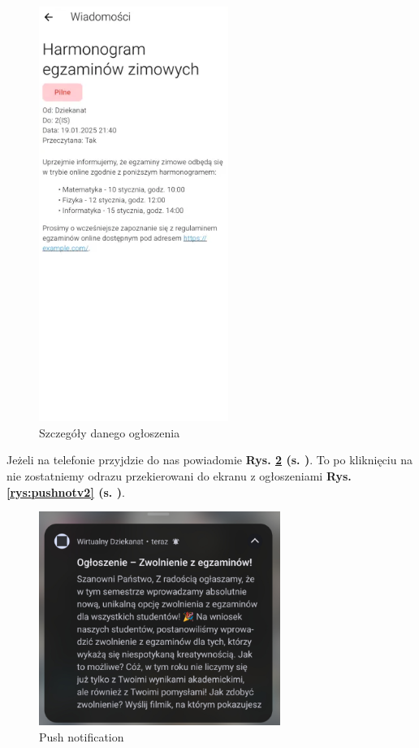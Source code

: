 \begin{figure}[h!]
	\centering
	\includegraphics[width=0.55\textwidth]{rys/ogloszenieszcz.png}
	\caption{Szczegóły danego ogłoszenia}
	\label{rys:ogloszenieszcz}
\end{figure}
\newpage
Jeżeli na telefonie przyjdzie do nas powiadomie \textbf{Rys. \ref{rys:pushnot} (s. \pageref{rys:pushnot})}. To po kliknięciu na nie zostatniemy odrazu przekierowani do ekranu z ogłoszeniami \textbf{Rys. \ref{rys:pushnotv2} (s. \pageref{rys:pushnotv2})}.
\begin{figure}[h!]
	\centering
	\includegraphics[width=0.7\textwidth]{rys/pushnot.png}
	\caption{Push notification}
	\label{rys:pushnot}
\end{figure}
